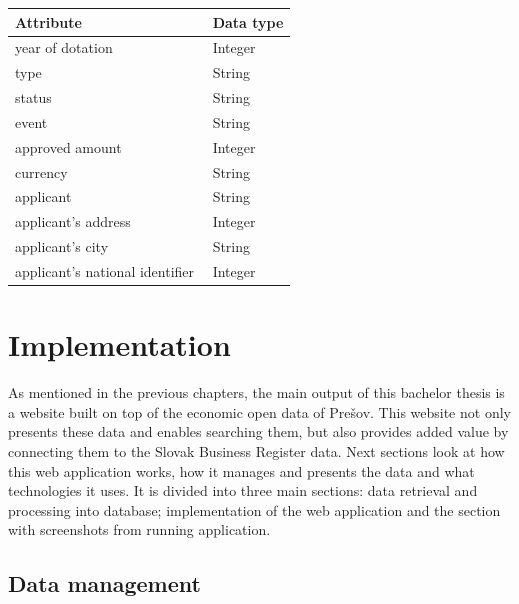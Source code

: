\documentclass[thesis=B,english]{FITthesis}[2012/06/26]
\begin{document}
    \begin{center}
        \begin{tabular}{  p{0.7\linewidth} | p{0.3\linewidth} }
        Attribute & Data type\\ \hline
        year of dotation & Integer \\
        type & String \\
        status & String \\
        event & String \\
        approved amount & Integer \\
        currency & String \\
        applicant & String \\
        applicant's address & Integer \\
        applicant's city & String \\
        applicant's national identifier & Integer \\
        \end{tabular}
    \end{center}	
	
	\chapter{Implementation}
	As mentioned in the previous chapters, the main output of this bachelor thesis is a website built on top of the economic open data of Prešov. This website not only presents these data and enables searching them, but also provides added value by connecting them to the Slovak Business Register data. Next sections look at how this web application works, how it manages and presents the data and what technologies it uses.   It is divided into three main sections: data retrieval and processing into database; implementation of the web application and the section with screenshots from running application.
	\section{Data management}
\end{document}
